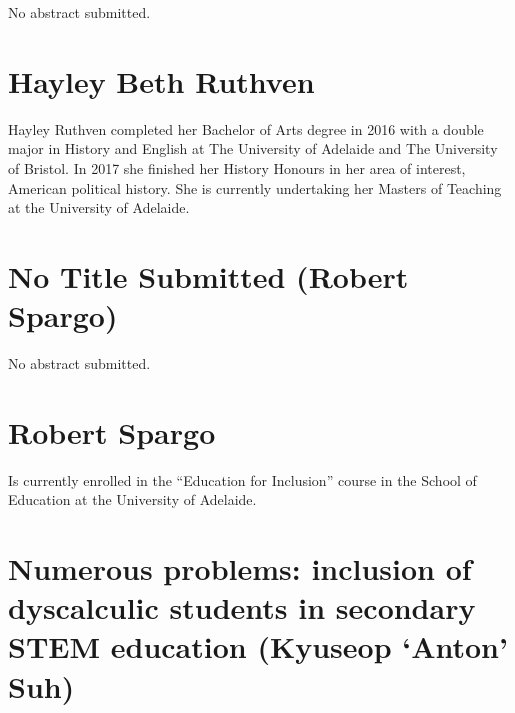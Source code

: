 \documentclass[twoside,14pt,a4paper,notitlepage]{memoir}
\begin{document}
No abstract submitted.

\section*{Hayley Beth Ruthven}

Hayley Ruthven completed her Bachelor of Arts degree in 2016 with a double major in History and English at The University of Adelaide and The University of Bristol. In 2017 she finished her History Honours in her area of interest, American political history. She is currently undertaking her Masters of Teaching at the University of Adelaide.



\section*{No Title Submitted (Robert Spargo)}
\label{aut:spargo}

No abstract submitted.

\section*{Robert Spargo}

Is currently enrolled in the ``Education for Inclusion'' course in the School of Education at the University of Adelaide.



\section*{Numerous problems: inclusion of dyscalculic students in secondary STEM education (Kyuseop `Anton' Suh)}
\label{aut:suh}
\end{document}
